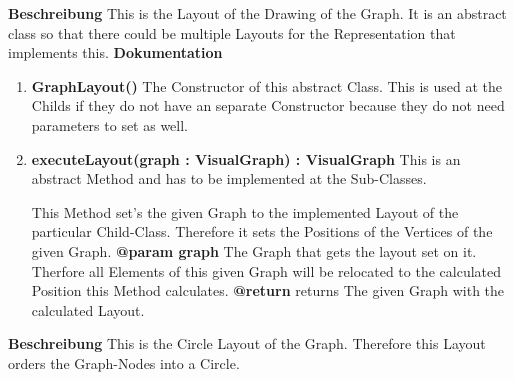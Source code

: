 				\textbf{Beschreibung}\newline
				This is the Layout of the Drawing of the Graph.				
				It is an abstract class so that there could be multiple Layouts for the Representation that implements this.
				\textbf{Dokumentation}\newline
				\begin{enumerate}[+]
					\item{
						\textbf{GraphLayout()} \newline
						The Constructor of this abstract Class.
						This is used at the Childs if they do not have an separate Constructor because they do not need parameters to set as well.
						\newline
					}
					\item{
						\textbf{executeLayout(graph : VisualGraph) : VisualGraph} \newline
							This is an abstract Method and has to be implemented at the Sub-Classes.
							
							This Method set's the given Graph to the implemented Layout of the particular Child-Class.
							Therefore it sets the Positions of the Vertices of the given Graph.
						\newline
						\textbf{@param graph}
							The Graph that gets the layout set on it.
							Therfore all Elements of this given Graph will be relocated to the calculated Position this Method calculates.
							\newline
						\textbf{@return} returns
							The given Graph with the calculated Layout.
							\newline
					}
				\end{enumerate}
			
				\textbf{Beschreibung}\newline
				This is the Circle Layout of the Graph.
				Therefore this Layout orders the Graph-Nodes into a Circle.
				
